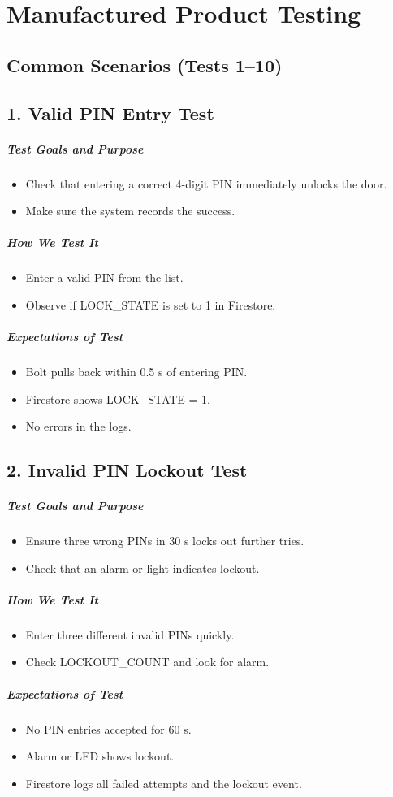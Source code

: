 \newpage
\section{Manufactured Product Testing}

\subsection*{Common Scenarios (Tests 1–10)}

\subsection*{1. Valid PIN Entry Test}
\subparagraph{Test Goals and Purpose}
\begin{itemize}
    \item Check that entering a correct 4-digit PIN immediately unlocks the door.
    \item Make sure the system records the success.
\end{itemize}
\subparagraph{How We Test It}
\begin{itemize}
    \item Enter a valid PIN from the list.
    \item Observe if LOCK\_STATE is set to 1 in Firestore.
\end{itemize}
\subparagraph{Expectations of Test}
\begin{itemize}
    \item Bolt pulls back within 0.5 s of entering PIN.
    \item Firestore shows LOCK\_STATE = 1.
    \item No errors in the logs.
\end{itemize}

\subsection*{2. Invalid PIN Lockout Test}
\subparagraph{Test Goals and Purpose}
\begin{itemize}
    \item Ensure three wrong PINs in 30 s locks out further tries.
    \item Check that an alarm or light indicates lockout.
\end{itemize}
\subparagraph{How We Test It}
\begin{itemize}
    \item Enter three different invalid PINs quickly.
    \item Check LOCKOUT\_COUNT and look for alarm.
\end{itemize}
\subparagraph{Expectations of Test}
\begin{itemize}
    \item No PIN entries accepted for 60 s.
    \item Alarm or LED shows lockout.
    \item Firestore logs all failed attempts and the lockout event.
\end{itemize}

